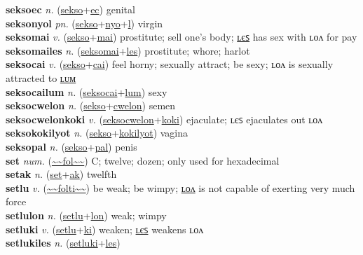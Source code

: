 \textbf{seksoec} \textit{n.} (\hyperref[sekso]{sekso}+\hyperref[ec]{ec})
genital \label{seksoec} \\
\textbf{seksonyol} \textit{pn.} (\hyperref[sekso]{sekso}+\hyperref[nyo]{nyo}+\hyperref[l]{l})
virgin \label{seksonyol} \\
\textbf{seksomai} \textit{v.} (\hyperref[sekso]{sekso}+\hyperref[mai]{mai})
prostitute; sell one's body; \hyperref[seksomailes]{ʟєꜱ} has sex with ʟᴏᴧ for pay \label{seksomai} \\
\textbf{seksomailes} \textit{n.} (\hyperref[seksomai]{seksomai}+\hyperref[les]{les})
prostitute; whore; harlot \label{seksomailes} \\
\textbf{seksocai} \textit{v.} (\hyperref[sekso]{sekso}+\hyperref[cai]{cai})
feel horny; sexually attract; be sexy; ʟᴏᴧ is sexually attracted to \hyperref[seksocailum]{ʟᴜᴍ} \label{seksocai} \\
\textbf{seksocailum} \textit{n.} (\hyperref[seksocai]{seksocai}+\hyperref[lum]{lum})
sexy \label{seksocailum} \\
\textbf{seksocwelon} \textit{n.} (\hyperref[sekso]{sekso}+\hyperref[cwelon]{cwelon})
semen \label{seksocwelon} \\
\textbf{seksocwelonkoki} \textit{v.} (\hyperref[seksocwelon]{seksocwelon}+\hyperref[koki]{koki})
ejaculate; ʟєꜱ ejaculates out ʟᴏᴧ \label{seksocwelonkoki} \\
\textbf{seksokokilyot} \textit{n.} (\hyperref[sekso]{sekso}+\hyperref[kokilyot]{kokilyot})
vagina \label{seksokokilyot} \\
\textbf{seksopal} \textit{n.} (\hyperref[sekso]{sekso}+\hyperref[pal]{pal})
penis \label{seksopal} \\
\textbf{set} \textit{num.} (\hyperref[fol]{\~{}\~{}fol\~{}\~{}})
C; twelve; dozen; only used for hexadecimal \label{set} \\
\textbf{setak} \textit{n.} (\hyperref[set]{set}+\hyperref[ak]{ak})
twelfth \label{setak} \\
\textbf{setlu} \textit{v.} (\hyperref[folti]{\~{}\~{}folti\~{}\~{}})
be weak; be wimpy; \hyperref[setlulon]{ʟᴏᴧ} is not capable of exerting very much force \label{setlu} \\
\textbf{setlulon} \textit{n.} (\hyperref[setlu]{setlu}+\hyperref[lon]{lon})
weak; wimpy \label{setlulon} \\
\textbf{setluki} \textit{v.} (\hyperref[setlu]{setlu}+\hyperref[ki]{ki})
weaken; \hyperref[setlukiles]{ʟєꜱ} weakens ʟᴏᴧ \label{setluki} \\
\textbf{setlukiles} \textit{n.} (\hyperref[setluki]{setluki}+\hyperref[les]{les})
